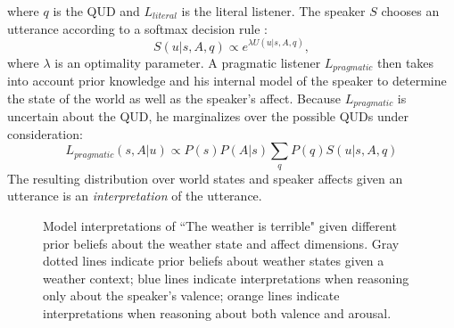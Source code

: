 \documentclass[10pt,letterpaper]{article}
\begin{document}
where $q$ is the QUD and $L_{literal}$ is the literal listener. 
The speaker $S$ chooses an utterance according to a softmax decision rule \cite{sutton1998reinforcement}:
\begin{equation}
S(u | s, A, q) \propto e^{\lambda U(u | s, A, q)},
\end{equation}
where $\lambda$ is an optimality parameter.
%
A pragmatic listener $L_{pragmatic}$ then takes into account prior knowledge and his internal model of the speaker to determine the state of the world as well as the speaker's affect. Because $L_{pragmatic}$ is uncertain about the QUD, he marginalizes over the possible QUDs under consideration:
$$
L_{pragmatic}(s, A | u) \propto P(s) P(A | s) \sum_{q}{P (q) S (u|s, A, q)}
$$
%
The resulting distribution over world states and speaker affects given an utterance is an \emph{interpretation} of the utterance. 

\begin{figure}
\caption{Model interpretations of ``The weather is terrible" given different prior beliefs about the weather state and affect dimensions. Gray dotted lines indicate prior beliefs about weather states given a weather context; blue lines indicate interpretations when reasoning only about the speaker's valence; orange lines indicate interpretations when reasoning about both valence and arousal.}
\label{sim12}
\end{figure}
\end{document}
